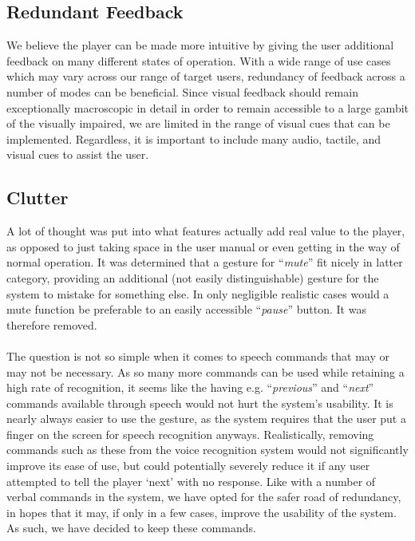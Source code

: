 \documentclass[10pt,letterpaper]{article}
\begin{document}
\subsection*{Redundant Feedback}
We believe the player can be made more intuitive by giving the user additional feedback on many different states of operation. With a wide range of use cases which may vary across our range of target users, redundancy of feedback across a number of modes can be beneficial. Since visual feedback should remain exceptionally macroscopic in detail in order to remain accessible to a large gambit of the visually impaired, we are limited in the range of visual cues that can be implemented. Regardless, it is important to include many audio, tactile, and visual cues to assist the user.

\subsection*{Clutter}
A lot of thought was put into what features actually add real value to the player, as opposed to just taking space in the user manual or even getting in the way of normal operation. It was determined that a gesture for ``\textit{mute}'' fit nicely in latter category, providing an additional (not easily distinguishable) gesture for the system to mistake for something else. In only negligible realistic cases would a mute function be preferable to an easily accessible ``\textit{pause}'' button. It was therefore removed.
\\ \\ 
The question is not so simple when it comes to speech commands that may or may not be necessary. As so many more commands can be used while retaining a high rate of recognition, it seems like the having e.g. ``\textit{previous}'' and ``\textit{next}'' commands available through speech would not hurt the system's usability. It is nearly always easier to use the gesture, as the system requires that the user put a finger on the screen for speech recognition anyways. Realistically, removing commands such as these from the voice recognition system would not significantly improve its ease of use, but could potentially severely reduce it if any user attempted to tell the player `next' with no response. Like with a number of verbal commands in the system, we have opted for the safer road of redundancy, in hopes that it may, if only in a few cases, improve the usability of the system. As such, we have decided to keep these commands.
\end{document}
